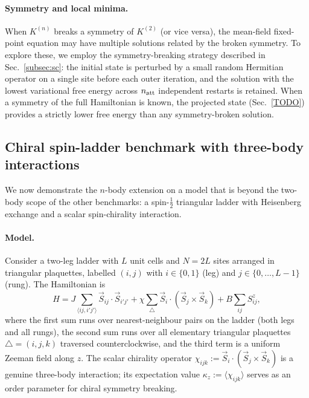\paragraph{Symmetry and local minima.}
When $K^{(n)}$ breaks a symmetry of $K^{(2)}$ (or vice versa), the mean-field
fixed-point equation may have multiple solutions related by the broken
symmetry.
To explore these, we employ the symmetry-breaking strategy described in
Sec.~\ref{subsec:sc}: the initial state is perturbed by a small random
Hermitian operator on a single site before each outer iteration, and the
solution with the lowest variational free energy across $n_{\rm att}$
independent restarts is retained.
When a symmetry of the full Hamiltonian is known, the projected state
(Sec.~\ref{TODO}) provides a strictly lower free energy than any
symmetry-broken solution.


\subsection{Chiral spin-ladder benchmark with three-body interactions}
\label{subsec:chiral_benchmark}

We now demonstrate the $n$-body extension on a model that is beyond the
two-body scope of the other benchmarks: a spin-$\tfrac{1}{2}$ triangular
ladder with Heisenberg exchange and a scalar spin-chirality interaction.

\paragraph{Model.}
Consider a two-leg ladder with $L$ unit cells and $N=2L$ sites arranged in
triangular plaquettes, labelled $(i,j)$ with $i\in\{0,1\}$ (leg) and
$j\in\{0,\ldots,L-1\}$ (rung).
The Hamiltonian is
\begin{equation}
  H = J\!\sum_{\langle ij,i'j'\rangle}\!\vec{S}_{ij}\cdot\vec{S}_{i'j'}
    + \chi\!\sum_{\triangle}\vec{S}_i\cdot(\vec{S}_j\times\vec{S}_k)
    + B\sum_{ij} S^z_{ij},
  \label{eq:H_chiral}
\end{equation}
where the first sum runs over nearest-neighbour pairs on the ladder (both legs
and all rungs), the second sum runs over all elementary triangular plaquettes
$\triangle = (i,j,k)$ traversed counterclockwise, and the third term is a
uniform Zeeman field along $z$.
The scalar chirality operator $\chi_{ijk} :=
\vec{S}_i\cdot(\vec{S}_j\times\vec{S}_k)$ is a genuine three-body interaction;
its expectation value $\kappa_z := \langle\chi_{ijk}\rangle$ serves as an
order parameter for chiral symmetry breaking.

